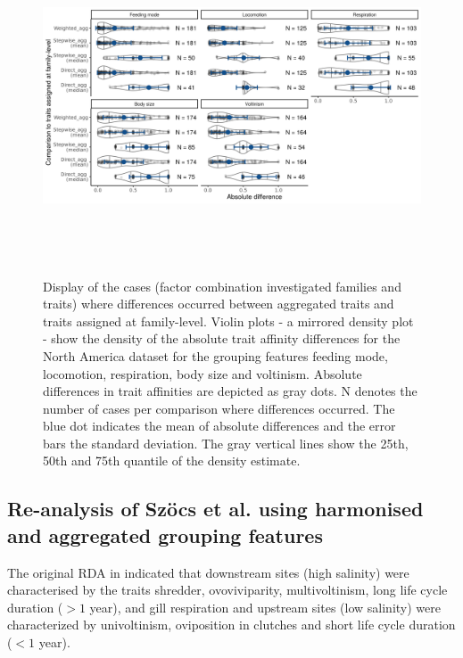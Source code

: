 \documentclass{article}
\begin{document}
\begin{figure}[H]
  \centering
  \includegraphics[width=16.5cm, height=10cm]{Deviances_trait_agg_pyne.png}
  \caption{Display of the cases (factor combination investigated families and traits) where differences occurred between aggregated traits and traits assigned at family-level. Violin plots - a mirrored density plot - show the density of the absolute trait affinity differences for the North America dataset for the grouping features feeding mode, locomotion, respiration, body size and voltinism. Absolute differences in trait affinities are depicted as gray dots. N denotes the number of cases per comparison where differences occurred. The blue dot indicates the mean of absolute differences and the error bars the standard deviation. The gray vertical lines show the 25th, 50th and 75th quantile of the density estimate.}
  \label{fig:diff_aggr_traits_pyne}
\end{figure}

\newpage 


\subsection*{Re-analysis of Szöcs et al. using harmonised and aggregated grouping features}

The original RDA in \citet{szocs_effects_2014} indicated that downstream sites (high salinity) were characterised by the traits shredder, ovoviviparity, multivoltinism, long life cycle duration ($> 1$ year), and gill respiration and upstream sites (low salinity) were characterized by univoltinism, oviposition in clutches and short life cycle duration ($< 1$ year). 
\end{document}
